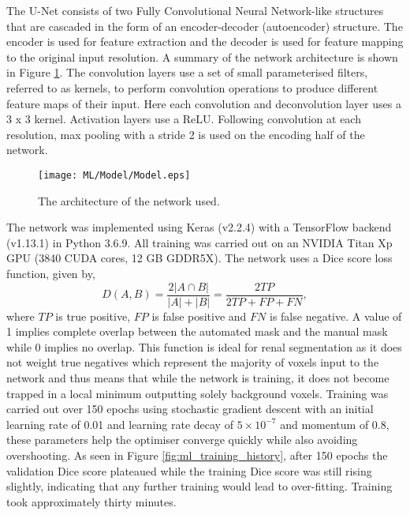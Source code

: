 The U-Net consists of two Fully Convolutional Neural Network-like structures that are cascaded in the form of an encoder-decoder (autoencoder) structure. The encoder is used for feature extraction and the decoder is used for feature mapping to the original input resolution. A summary of the network architecture is shown in Figure \ref{fig:ml_network}. The convolution layers use a set of small parameterised filters, referred to as kernels, to perform convolution operations to produce different feature maps of their input. Here each convolution and deconvolution layer uses a 3 x 3 kernel. Activation layers use a \ac{ReLU}. Following convolution at each resolution, max pooling with a stride 2 is used on the encoding half of the network.

\begin{figure}[h]
	\centering
	\texttt{[image: ML/Model/Model.eps]}
	\caption{The architecture of the network used.}
	\label{fig:ml_network}	
\end{figure}

The network was implemented using Keras (v2.2.4) \cite{chollet_keras_2015} with a TensorFlow backend (v1.13.1) \cite{abadi_tensorflow_2015} in Python 3.6.9. All training was carried out on an NVIDIA Titan Xp \ac{GPU} (3840 CUDA cores, 12 GB GDDR5X). The network uses a Dice score loss function, given by,
\begin{equation}
	D\left(A, B\right) = \frac{2\left| A \cap B \right|}{\left|A\right|+\left|B\right|} = \frac{2TP}{2TP + FP + FN},
	\label{eq:dice}
\end{equation} 
where $TP$ is true positive, $FP$ is false positive and $FN$ is false negative. A value of 1 implies complete overlap between the automated mask and the manual mask while 0 implies no overlap. This function is ideal for renal segmentation as it does not weight true negatives which represent the majority of voxels input to the network and thus means that while the network is training, it does not become trapped in a local minimum outputting solely background voxels. Training was carried out over 150 epochs using stochastic gradient descent with an initial learning rate of 0.01 and learning rate decay of $5\times10^{-7}$ and momentum of 0.8, these parameters help the optimiser converge quickly while also avoiding overshooting. As seen in Figure \ref{fig:ml_training_history}, after 150 epochs the validation Dice score plateaued while the training Dice score was still rising slightly, indicating that any further training would lead to over-fitting. Training took approximately thirty minutes.


